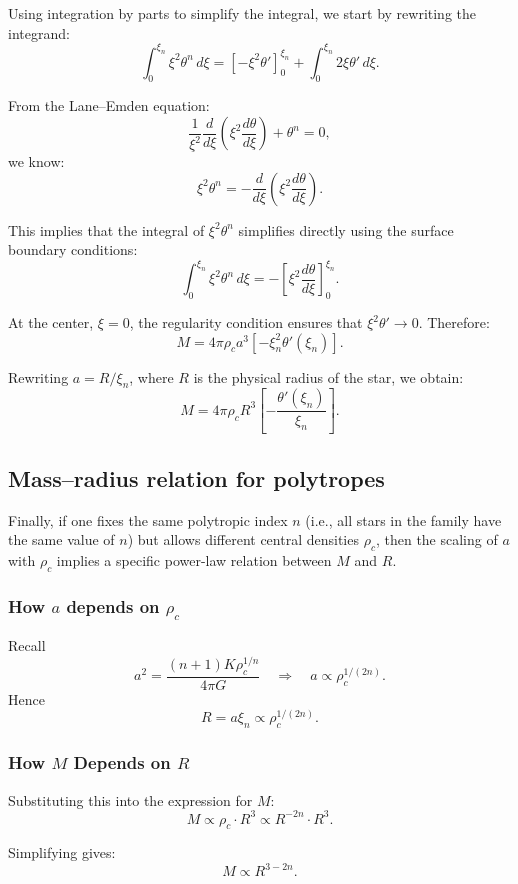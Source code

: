 \documentclass[12pt]{article}
\begin{document}
Using integration by parts to simplify the integral, we start by rewriting the integrand:
\[
\int_0^{\xi_n} \xi^2 \theta^n \, d\xi = \left[ -\xi^2 \theta' \right]_0^{\xi_n} + \int_0^{\xi_n} 2\xi \theta' \, d\xi.
\]

From the Lane–Emden equation:
\[
\frac{1}{\xi^2} \frac{d}{d\xi} \left( \xi^2 \frac{d\theta}{d\xi} \right) + \theta^n = 0,
\]
we know:
\[
\xi^2 \theta^n = -\frac{d}{d\xi} \left( \xi^2 \frac{d\theta}{d\xi} \right).
\]

This implies that the integral of \(\xi^2 \theta^n\) simplifies directly using the surface boundary conditions:
\[
\int_0^{\xi_n} \xi^2 \theta^n \, d\xi = -\left[\xi^2 \frac{d\theta}{d\xi}\right]_0^{\xi_n}.
\]

At the center, \(\xi = 0\), the regularity condition ensures that \(\xi^2 \theta' \to 0\). Therefore:
\[
M = 4\pi \rho_c a^3 \left[ -\xi_n^2 \theta'(\xi_n) \right].
\]

Rewriting \(a = R / \xi_n\), where \(R\) is the physical radius of the star, we obtain:
\[
M = 4\pi \rho_c R^3 \left[ -\frac{\theta'(\xi_n)}{\xi_n} \right].
\]

\subsection{Mass–radius relation for polytropes}

Finally, if one fixes the same polytropic index \(n\) (i.e., all stars in the family have the same value of \(n\)) but allows different central densities \(\rho_c\), then the scaling of \(a\) with \(\rho_c\) implies a specific power-law relation between \(M\) and \(R\).

\subsubsection{How \(a\) depends on \(\rho_c\)}

Recall
\[
a^2 
= \frac{(n+1)K\rho_c^{1/n}}{4\pi G}
\quad\Longrightarrow\quad
a \propto \rho_c^{1/(2n)}.
\]
Hence
\[
R = a \xi_n \propto \rho_c^{1/(2n)}.
\]

\subsubsection{How \(M\) Depends on \(R\)}

Substituting this into the expression for \(M\):
\[
M \propto \rho_c \cdot R^3 \propto R^{-2n} \cdot R^3.
\]

Simplifying gives:
\[
M \propto R^{3 - 2n}.
\]
\end{document}
